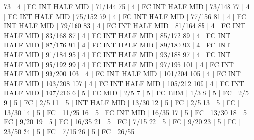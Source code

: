 73    |  4     |    FC  INT  HALF            MID              | 71/144   
75    |  4     |    FC  INT  HALF            MID              | 73/148   
77    |  4     |    FC  INT  HALF            MID              | 75/152   
79    |  4     |    FC  INT  HALF            MID              | 77/156   
81    |  4     |    FC  INT  HALF            MID              | 79/160   
83    |  4     |    FC  INT  HALF            MID              | 81/164   
85    |  4     |    FC  INT  HALF            MID              | 83/168   
87    |  4     |    FC  INT  HALF            MID              | 85/172   
89    |  4     |    FC  INT  HALF            MID              | 87/176   
91    |  4     |    FC  INT  HALF            MID              | 89/180   
93    |  4     |    FC  INT  HALF            MID              | 91/184   
95    |  4     |    FC  INT  HALF            MID              | 93/188   
97    |  4     |    FC  INT  HALF            MID              | 95/192   
99    |  4     |    FC  INT  HALF            MID              | 97/196   
101   |  4     |    FC  INT  HALF            MID              | 99/200   
103   |  4     |    FC  INT  HALF            MID              | 101/204   
105   |  4     |    FC  INT  HALF            MID              | 103/208   
107   |  4     |    FC  INT  HALF            MID              | 105/212   
109   |  4     |    FC  INT  HALF            MID              | 107/216   
6     |  5     |    FC                       MID              | 2/5   
7     |  5     |    FC             EBM                        | 1/3   
8     |  5     |    FC                                        | 2/5   
9     |  5     |    FC                                        | 2/5   
11    |  5     |        INT  HALF            MID              | 13/30   
12    |  5     |    FC                                        | 2/5   
13    |  5     |    FC                                        | 13/30   
14    |  5     |    FC                                        | 11/25   
16    |  5     |    FC  INT                  MID              | 16/35   
17    |  5     |    FC                                        | 13/30   
18    |  5     |    FC                                        | 9/20   
19    |  5     |    FC                                        | 16/35   
21    |  5     |    FC                                        | 7/15   
22    |  5     |    FC                                        | 9/20   
23    |  5     |    FC                                        | 23/50   
24    |  5     |    FC                                        | 7/15   
26    |  5     |    FC                                        | 26/55   
